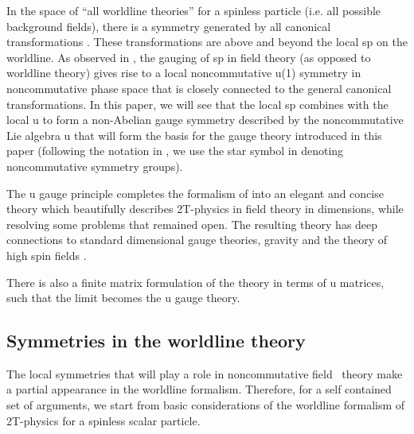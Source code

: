 \documentclass[a4paper,12pt]{article}
\begin{document}
In the space of ``all worldline theories'' for a spinless particle (i.e. all
possible background fields), there is a symmetry generated by all canonical
transformations \cite{highspin}. These transformations are above and beyond
the local sp\coordHE{} on the worldline. As observed in \cite{NCSp}%
, the gauging of sp\coordHE{} in field theory (as opposed to
worldline theory) gives rise to a local noncommutative u\myHighlight{$_{\star }$}\coordHE{}(1)
symmetry in noncommutative phase space that is closely connected to the
general canonical transformations. In this paper, we will see that the local
sp\coordHE{} combines with the local u\myHighlight{$\left( 1\right) $}\coordHE{} to form a
non-Abelian gauge symmetry described by the noncommutative Lie algebra u\coordHE{} that will form the basis for the gauge theory
introduced in this paper (following the notation in \cite{ncOn}, we use the
star symbol \myHighlight{$\star $}\coordHE{} in denoting noncommutative symmetry groups).

The u\coordHE{} gauge principle completes the formalism
of \cite{NCSp} into an elegant and concise theory which beautifully
describes 2T-physics in field theory in \coordHE{} dimensions, while resolving
some problems that remained open. The resulting theory has deep connections
to standard \coordHE{} dimensional gauge theories, gravity and the theory of high
spin fields \cite{vasil}.

There is also a finite matrix formulation of the theory in terms of u\coordHE{} matrices, such that the \coordHE{} limit becomes
the u\coordHE{} gauge theory.

\subsection{Symmetries in the worldline theory}

The local symmetries that will play a role in noncommutative field \ theory
make a partial appearance in the worldline formalism. Therefore, for a self
contained set of arguments, we start from basic considerations of the
worldline formalism of 2T-physics for a spinless scalar particle.
\end{document}
